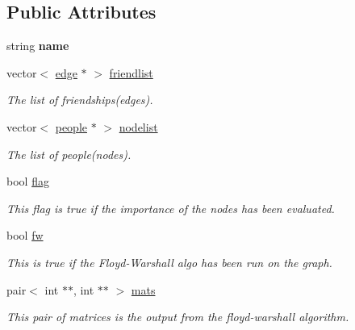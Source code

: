 \subsection*{\-Public \-Attributes}
\begin{DoxyCompactItemize}
\item 
\hypertarget{classsimplegraph_ac4843946f6cb77c310428f919a71a68f}{string {\bfseries name}}\label{classsimplegraph_ac4843946f6cb77c310428f919a71a68f}

\item 
\hypertarget{classsimplegraph_af598e792b56b68fd23e8679132e68de2}{vector$<$ \hyperlink{classedge}{edge} $\ast$ $>$ \hyperlink{classsimplegraph_af598e792b56b68fd23e8679132e68de2}{friendlist}}\label{classsimplegraph_af598e792b56b68fd23e8679132e68de2}

\begin{DoxyCompactList}\small\item\em \-The list of friendships(edges). \end{DoxyCompactList}\item 
\hypertarget{classsimplegraph_a1af6d6e8bfbdf2b19a31a6699abeab83}{vector$<$ \hyperlink{classpeople}{people} $\ast$ $>$ \hyperlink{classsimplegraph_a1af6d6e8bfbdf2b19a31a6699abeab83}{nodelist}}\label{classsimplegraph_a1af6d6e8bfbdf2b19a31a6699abeab83}

\begin{DoxyCompactList}\small\item\em \-The list of people(nodes). \end{DoxyCompactList}\item 
\hypertarget{classsimplegraph_a59dfb29bb90b5bef32faa1644622c4cf}{bool \hyperlink{classsimplegraph_a59dfb29bb90b5bef32faa1644622c4cf}{flag}}\label{classsimplegraph_a59dfb29bb90b5bef32faa1644622c4cf}

\begin{DoxyCompactList}\small\item\em \-This flag is true if the importance of the nodes has been evaluated. \end{DoxyCompactList}\item 
\hypertarget{classsimplegraph_a6c1223021054abfe96939e20a67e7db6}{bool \hyperlink{classsimplegraph_a6c1223021054abfe96939e20a67e7db6}{fw}}\label{classsimplegraph_a6c1223021054abfe96939e20a67e7db6}

\begin{DoxyCompactList}\small\item\em \-This is true if the \-Floyd-\/\-Warshall algo has been run on the graph. \end{DoxyCompactList}\item 
\hypertarget{classsimplegraph_a063664994a93751a656a3736cd710009}{pair$<$ int $\ast$$\ast$, int $\ast$$\ast$ $>$ \hyperlink{classsimplegraph_a063664994a93751a656a3736cd710009}{mats}}\label{classsimplegraph_a063664994a93751a656a3736cd710009}

\begin{DoxyCompactList}\small\item\em \-This pair of matrices is the output from the floyd-\/warshall algorithm. \end{DoxyCompactList}\end{DoxyCompactItemize}


